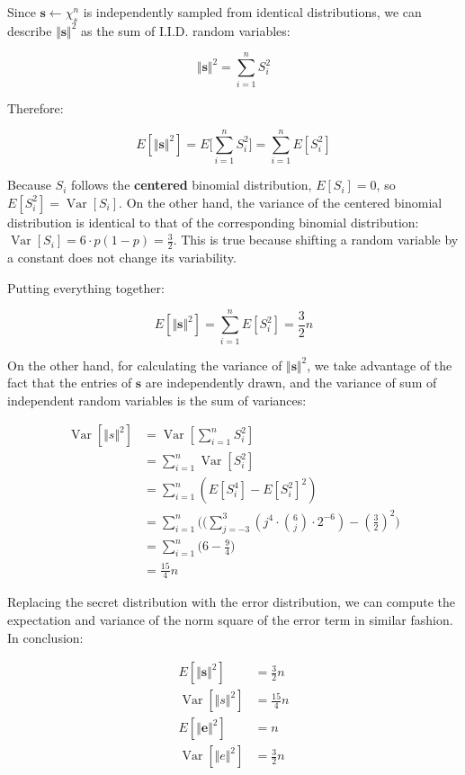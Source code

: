 \documentclass{article}
\newcommand{\norm}[1]{\Vert {#1} \Vert}
\newcommand{\var}[1]{\operatorname{Var}[{#1}]}
\begin{document}
Since $\mathbf{s} \leftarrow \chi_s^{n}$ is independently sampled from identical distributions, we can describe $\norm{\mathbf{s}}^2$ as the sum of I.I.D. random variables:

$$
\norm{\mathbf{s}}^2 = \sum_{i=1}^{n} S_i^2
$$

Therefore:

$$
E[\norm{\mathbf{s}}^2] = E\bigg[\sum_{i=1}^{n} S_i^2\bigg] = \sum_{i=1}^{n}E[S_i^2]
$$

Because $S_i$ follows the \textbf{centered} binomial distribution, $E[S_i] = 0$, so $E[S_i^2] = \var{S_i}$. On the other hand, the variance of the centered binomial distribution is identical to that of the corresponding binomial distribution: $\var{S_i} = 6 \cdot p(1-p) = \frac{3}{2}$. This is true because shifting a random variable by a constant does not change its variability.

Putting everything together:

$$
E[\norm{\mathbf{s}}^2] = \sum_{i=1}^{n}E[S_i^2] = \frac{3}{2} n
$$

On the other hand, for calculating the variance of $\norm{\mathbf{s}}^2$, we take advantage of the fact that the entries of $\mathbf{s}$ are independently drawn, and the variance of sum of independent random variables is the sum of variances:

$$
\begin{aligned}
\var{\norm{s}^2} &= \var{\sum_{i=1}^n S_i^2} \\
&= \sum_{i=1}^n \var{S_i^2} \\
&= \sum_{i=1}^n (E[S_i^4] - E[S_i^2]^2) \\
&= \sum_{i=1}^n \bigg(
    (\sum_{j=-3}^3(j^4 \cdot {6 \choose j} \cdot 2^{-6}) 
    - (\frac{3}{2})^2 
\bigg) \\
&= \sum_{i=1}^n \bigg( 6  - \frac{9}{4} \bigg) \\
&= \frac{15}{4}n
\end{aligned}
$$

Replacing the secret distribution with the error distribution, we can compute the expectation and variance of the norm square of the error term in similar fashion. In conclusion:

$$
\begin{aligned}
E[\norm{\mathbf{s}}^2] &= \frac{3}{2} n \\
\var{\norm{s}^2} &= \frac{15}{4}n \\
E[\norm{\mathbf{e}}^2] &= n \\
\var{\norm{e}^2} &= \frac{3}{2}n
\end{aligned}
$$
\end{document}
